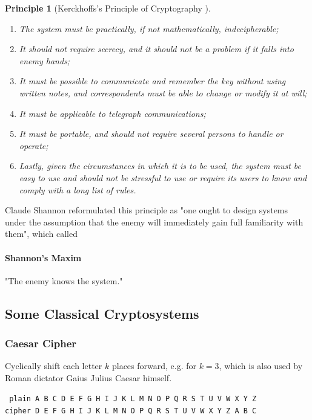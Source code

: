 \documentclass{article}
\newtheorem{principle}[theorem]{Principle}
\begin{document}
\begin{principle}[Kerckhoffs's Principle of Cryptography \cite{Kerckhoffs_1883}]
    \mbox{}\\
    \begin{enumerate}
        \item The system must be practically, if not mathematically, indecipherable;
        \item It should not require secrecy, and it should not be a problem if it falls into enemy hands;
        \item It must be possible to communicate and remember the key without using written notes, and correspondents must be able to change or modify it at will;
        \item It must be applicable to telegraph communications;
        \item It must be portable, and should not require several persons to handle or operate;
        \item Lastly, given the circumstances in which it is to be used, the system must be easy to use and should not be stressful to use or require its users to know and comply with a long list of rules.
    \end{enumerate}
\end{principle}

Claude Shannon reformulated this principle as "one ought to design systems under the assumption that the enemy will immediately gain full familiarity with them", which called

\paragraph{Shannon's Maxim} "The enemy knows the system."

\subsection{Some Classical Cryptosystems}

\subsubsection{Caesar Cipher}

Cyclically shift each letter $k$ places forward, e.g. for $k = 3$, which is also used by Roman dictator Gaius Julius Caesar himself.

\begin{center}
    \texttt{
         plain \quad A B C D E F G H I J K L M N O P Q R S T U V W X Y Z\\
        cipher \quad D E F G H I J K L M N O P Q R S T U V W X Y Z A B C
    }
\end{center}
\end{document}
